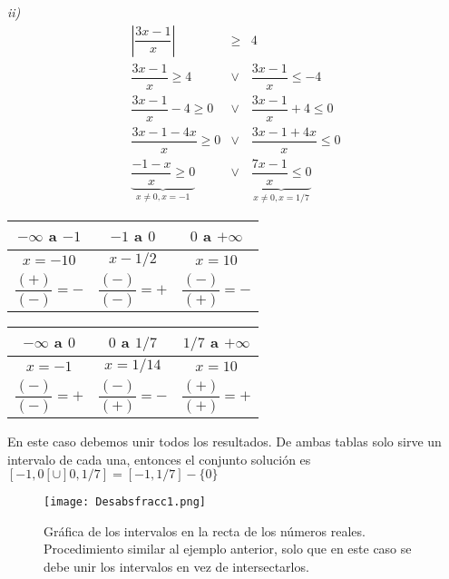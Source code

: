 \begin{myexample}
\noindent\textit{ii)}\\
\begin{eqnarray*}
\left|\dfrac{3x-1}{x}\right| &\geq &4  \\
\dfrac{3x-1}{x}\geq 4 &\vee & \dfrac{3x-1}{x}\leq -4\\
\dfrac{3x-1}{x}-4\geq 0 &\vee & \dfrac{3x-1}{x}+4\leq 0\\
\dfrac{3x-1-4x}{x}\geq 0 &\vee & \dfrac{3x-1+4x}{x}\leq 0\\
\underbrace{\dfrac{-1-x}{x}\geq 0}_{x\neq 0, x=-1} &\vee & \underbrace{\dfrac{7x-1}{x}\leq 0}_{x\neq 0, x=1/7}
\end{eqnarray*}
\end{myexample}

\begin{minipage}{0.5\textwidth}
\begin{tabular}{|c|c|c|}
\hline
  $-\infty$ a $-1$ & $-1$ a $0$ & $0$ a $+\infty$ \\
\hline
 $x=-10$ & $x-1/2$ & $x=10$  \\
  $\dfrac{(+)}{(-)}=-$&$\dfrac{(-)}{(-)}=+$&$\dfrac{(-)}{(+)}=-$\\
\hline
\end{tabular}
\end{minipage}
\begin{minipage}{0.5\textwidth}
\begin{tabular}{|c|c|c|}
\hline
 $-\infty$ a $0$ & $0$ a $1/7$& $1/7$ a $+\infty$    \\
\hline
 $x=-1$&$x=1/14$&$x=10$   \\
  $\dfrac{(-)}{(-)}=+$& $\dfrac{(-)}{(+)}=-$& $\dfrac{(+)}{(+)}=+$ \\
  \hline
\end{tabular}
\end{minipage}

En este caso debemos unir todos los resultados. De ambas tablas solo sirve un intervalo de cada una, entonces el conjunto solución es $[-1,0[\cup ]0,1/7]=[-1,1/7]-\{0\}$

\begin{center}
\begin{figure}[h!]
\centering
\texttt{[image: Desabsfracc1.png]}
\caption[Gráfica de los intervalos en la recta de los números reales.]{Gráfica de los intervalos en la recta de los números reales. Procedimiento similar al ejemplo anterior, solo que en este caso se debe unir los intervalos en vez de intersectarlos.}
\end{figure}
\end{center}